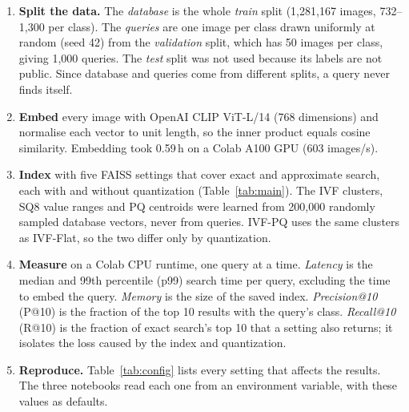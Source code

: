 \documentclass[sigconf,nonacm,pbalance]{acmart}
\begin{document}
\begin{enumerate}[nosep,leftmargin=*]
  \item \textbf{Split the data.} The \emph{database} is the whole \emph{train} split (1{,}281{,}167 images, 732--1{,}300 per class). The
  \emph{queries} are one image per class drawn uniformly at random (seed 42) from the \emph{validation} split, which has 50 images per class,
  giving 1{,}000 queries. The \emph{test} split was not used because its labels are not public. Since database and queries come from different
  splits, a query never finds itself.
  \item \textbf{Embed} every image with OpenAI CLIP ViT-L/14 (768 dimensions) and normalise each vector to unit length, so the inner product
  equals cosine similarity. Embedding took 0.59\,h on a Colab A100 GPU (603 images/s).
  \item \textbf{Index} with five FAISS settings that cover exact and approximate search, each with and without quantization (Table~\ref{tab:main}).
  The IVF clusters, SQ8 value ranges and PQ centroids were learned from 200{,}000 randomly sampled database vectors, never from queries.
  IVF-PQ uses the same clusters as IVF-Flat, so the two differ only by quantization.
  \item \textbf{Measure} on a Colab CPU runtime, one query at a time. \emph{Latency} is the median and 99th percentile (p99) search time per query,
  excluding the time to embed the query. \emph{Memory} is the size of the saved index. \emph{Precision@10} (P@10) is the fraction of the top 10
  results with the query's class. \emph{Recall@10} (R@10) is the fraction of exact search's top 10 that a setting also returns; it isolates the loss
  caused by the index and quantization.
  \item \textbf{Reproduce.} Table~\ref{tab:config} lists every setting that affects the results. The three notebooks read each one from an
  environment variable, with these values as defaults.
\end{enumerate}
\end{document}
